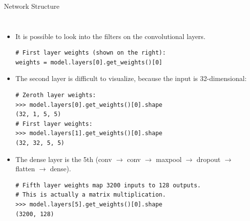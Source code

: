\documentclass[10pt, aspectratio=169]{beamer} %
\begin{document}
\begin{frame}[fragile]{Network Structure}
\begin{columns}
\begin{itemize}
	\item It is possible to look into the filters on the convolutional layers.
\begin{lstlisting}
# First layer weights (shown on the right):
weights = model.layers[0].get_weights()[0]
\end{lstlisting}
\item The second layer is difficult to visualize, because the input is 32-dimensional:
\begin{lstlisting}
# Zeroth layer weights:
>>> model.layers[0].get_weights()[0].shape
(32, 1, 5, 5)
# First layer weights:
>>> model.layers[1].get_weights()[0].shape
(32, 32, 5, 5)
\end{lstlisting}
\item The dense layer is the 5th (conv $\rightarrow$ conv $\rightarrow$ maxpool $\rightarrow$ dropout $\rightarrow$ flatten $\rightarrow$ dense).
\begin{lstlisting}
# Fifth layer weights map 3200 inputs to 128 outputs.
# This is actually a matrix multiplication.
>>> model.layers[5].get_weights()[0].shape
(3200, 128) 
\end{lstlisting}
	\end{itemize}

\end{columns}
\end{frame}
\end{document}
